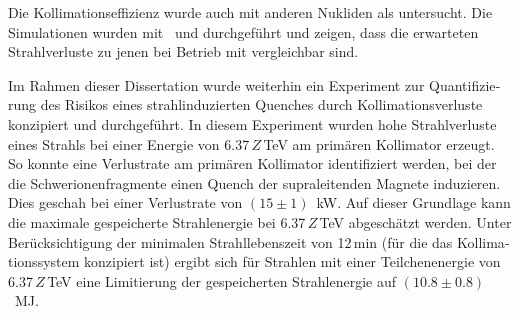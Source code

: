 \begin{otherlanguage}{german}

Die Kollimationseffizienz wurde auch mit anderen Nukliden als \lead untersucht. Die Simulationen wurden mit \, und  durchgef\"{u}hrt und zeigen, dass die erwarteten Strahlverluste  zu jenen bei Betrieb mit \lead vergleichbar sind. 
\vspace{0.2cm}

\thispagestyle{plain}

Im Rahmen dieser Dissertation wurde weiterhin ein Experiment zur Quantifizierung des Risikos eines strahlinduzierten Quenches durch Kollimationsverluste konzipiert und durchgef\"{u}hrt. In diesem Experiment wurden hohe Strahlverluste eines \lead Strahls bei einer Energie von 6.37$\,Z\,$TeV am prim\"{a}ren Kollimator erzeugt. So konnte eine Verlustrate am prim\"{a}ren Kollimator identifiziert werden, bei der die Schwerionenfragmente einen Quench der supraleitenden Magnete induzieren. Dies geschah bei einer Verlustrate von $(15 \pm 1)$~kW. Auf dieser Grundlage kann die maximale gespeicherte Strahlenergie bei 6.37$\,Z\,$TeV abgesch\"{a}tzt werden. Unter Ber\"{u}cksichtigung der minimalen Strahllebenszeit von 12\,min (f\"{u}r die das Kollimationssystem konzipiert ist) ergibt sich f\"{u}r \lead Strahlen mit einer Teilchenenergie von 6.37$\,Z\,$TeV eine Limitierung der gespeicherten Strahlenergie auf $(10.8 \pm 0.8)$~MJ.
\vspace{0.2cm}



\end{otherlanguage}
